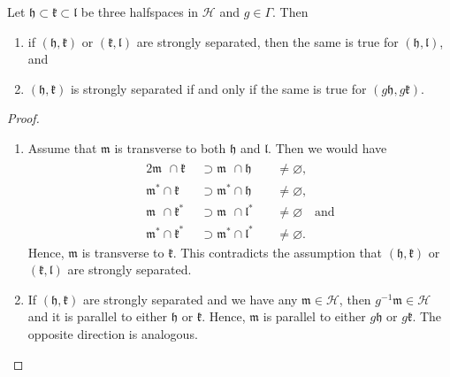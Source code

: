 \begin{lemma}
  \label{lem:strongly-sep}
  Let \(\mathfrak{h} \subset \mathfrak{k} \subset \mathfrak{l}\) be three halfspaces in \(\mathcal{H}\) and \(g \in \Gamma\). Then
  \begin{enumerate}
  \item if \((\mathfrak{h}, \mathfrak{k})\) or \((\mathfrak{k}, \mathfrak{l})\) are strongly separated, then the same is true for \((\mathfrak{h}, \mathfrak{l})\), and
  \item \((\mathfrak{h}, \mathfrak{k})\) is strongly separated if and only if the same is true for \((g\mathfrak{h}, g\mathfrak{k})\).
  \end{enumerate}
\end{lemma}

\begin{proof}~\vspace{-6pt}
  \begin{enumerate}
  \item Assume that \(\mathfrak{m}\) is transverse to both \(\mathfrak{h}\) and \(\mathfrak{l}\). Then we would have
    \begin{alignat*}{2}
      \mathfrak{m}^{\phantom{\ast}} \cap \mathfrak{k}^{\phantom{\ast}} & \supset \mathfrak{m}^{\phantom{\ast}} \cap \mathfrak{h}^{\phantom{\ast}} &&\neq \varnothing,\\
      \mathfrak{m}^\ast \cap \mathfrak{k}^{\phantom{\ast}}  & \supset \mathfrak{m}^\ast \cap \mathfrak{h}^{\phantom{\ast}} &&\neq \varnothing,\\
      \mathfrak{m}^{\phantom{\ast}} \cap \mathfrak{k}^\ast & \supset \mathfrak{m}^{\phantom{\ast}} \cap \mathfrak{l}^\ast &&\neq \varnothing\quad \text{and}\\
      \mathfrak{m}^\ast \cap \mathfrak{k}^\ast & \supset \mathfrak{m}^\ast \cap \mathfrak{l}^\ast &&\neq \varnothing.
    \end{alignat*}
    Hence, \(\mathfrak{m}\) is transverse to \(\mathfrak{k}\). This contradicts the assumption that \((\mathfrak{h}, \mathfrak{k})\) or \((\mathfrak{k}, \mathfrak{l})\) are strongly separated.
  \item If \((\mathfrak{h}, \mathfrak{k})\) are strongly separated and we have any \(\mathfrak{m} \in \mathcal{H}\), then \(g^{-1}\mathfrak{m} \in \mathcal{H}\) and it is parallel to either \(\mathfrak{h}\) or \(\mathfrak{k}\). Hence, \(\mathfrak{m}\) is parallel to either \(g\mathfrak{h}\) or \(g\mathfrak{k}\). The opposite direction is analogous.
  \end{enumerate}
\end{proof}

